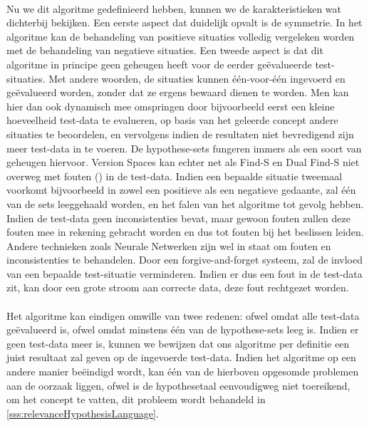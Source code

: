 \paragraph{}
Nu we dit algoritme gedefinieerd hebben, kunnen we de karakteristieken wat dichterbij bekijken. Een eerste aspect dat duidelijk opvalt is de symmetrie. In het algoritme kan de behandeling van positieve situaties volledig vergeleken worden met de behandeling van negatieve situaties. Een tweede aspect is dat dit algoritme in principe geen geheugen heeft voor de eerder geëvalueerde test-situaties. Met andere woorden, de situaties kunnen één-voor-één ingevoerd en geëvalueerd worden, zonder dat ze ergens bewaard dienen te worden. Men kan hier dan ook dynamisch mee omspringen door bijvoorbeeld eerst een kleine hoeveelheid test-data te evalueren, op basis van het geleerde concept andere situaties te beoordelen, en vervolgens indien de resultaten niet bevredigend zijn meer test-data in te voeren. De hypothese-sets fungeren immers als een soort van geheugen hiervoor. Version Spaces kan echter net als Find-S en Dual Find-S niet overweg met fouten () in de test-data. Indien een bepaalde situatie tweemaal voorkomt bijvoorbeeld in zowel een positieve als een negatieve gedaante, zal één van de sets leeggehaald worden, en het falen van het algoritme tot gevolg hebben. Indien de test-data geen inconsistenties bevat, maar gewoon fouten zullen deze fouten mee in rekening gebracht worden en dus tot fouten bij het beslissen leiden. Andere technieken zoals Neurale Netwerken zijn wel in staat om fouten en inconsistenties te behandelen. Door een forgive-and-forget systeem, zal de invloed van een bepaalde test-situatie verminderen. Indien er dus een fout in de test-data zit, kan door een grote stroom aan correcte data, deze fout rechtgezet worden.
\paragraph{}
Het algoritme kan eindigen omwille van twee redenen: ofwel omdat alle test-data geëvalueerd is, ofwel omdat minstens één van de hypothese-sets leeg is. Indien er geen test-data meer is, kunnen we bewijzen dat ons algoritme per definitie een juist resultaat zal geven op de ingevoerde test-data. Indien het algoritme op een andere manier beëindigd wordt, kan één van de hierboven opgesomde problemen aan de oorzaak liggen, ofwel is de hypothesetaal eenvoudigweg niet toereikend, om het concept te vatten, dit probleem wordt behandeld in \ref{sss:relevanceHypothesisLanguage}.
